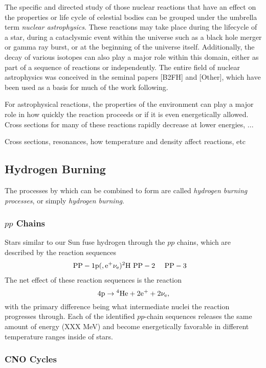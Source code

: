 The specific and directed study of those nuclear reactions that have an effect
on the properties or life cycle of celestial bodies can be grouped under the
umbrella term \emph{nuclear astrophysics}. These reactions may take place
during the lifecycle of a star, during a cataclysmic event within the universe
such as a black hole merger or gamma ray burst, or at the beginning of the
universe itself. Additionally, the decay of various isotopes can also play a
major role within this domain, either as part of a sequence of reactions or
independently. The entire field of nuclear astrophysics was conceived in the
seminal papers [B2FH] and [Other], which have been used as a basis for much of
the work following.

For astrophysical reactions, the properties of the environment can play a major
role in how quickly the reaction proceeds or if it is even energetically
allowed. Cross sections for many of these reactions rapidly decrease at lower
energies, ...

Cross sections, resonances, how temperature and density affect reactions, etc

\subsection{Hydrogen Burning}

The processes by which  can be combined to form  are
called \emph{hydrogen burning processes}, or simply \emph{hydrogen burning}.

\subsubsection{$pp$ Chains}

Stars similar to our Sun fuse hydrogen through the $pp$ chains, which are
described by the reaction sequences
\begin{align*}
    \rm{PP-1}& \rm{p}(\rm,e^+\nu_e){}^{2}\textrm{H} \
    \rm{PP-2}& \
    \rm{PP-3}&
\end{align*}
The net effect of these reaction sequences is the reaction
\[
    4\rm{p} \rightarrow {}^{4}\textrm{He} + 2e^+ + 2\nu_e,
\]
with the primary difference being what intermediate nuclei the reaction
progresses through. Each of the identified $pp$-chain sequences releases the
same amount of energy (XXX MeV) and become energetically favorable in different
temperature ranges inside of stars.

\subsubsection{CNO Cycles}

